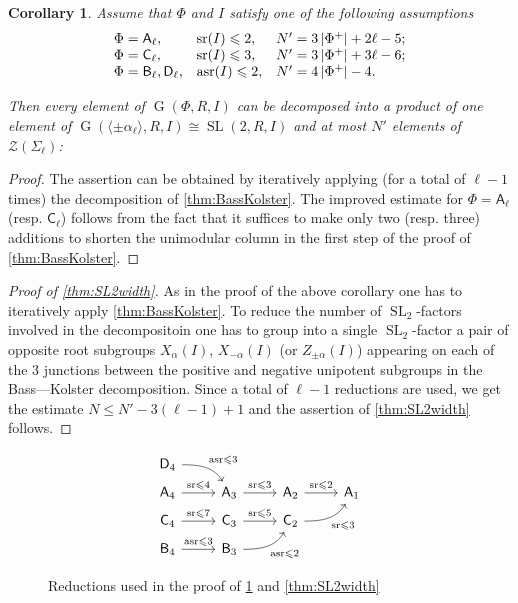 \documentclass[oneside, 12pt]{amsart}
\theoremstyle{plain}
\numberwithin{equation}{section}
\numberwithin{lemma}{section}
\newtheorem{cor}[lemma]{Corollary}
\theoremstyle{definition}
\theoremstyle{remark}
\DeclareMathOperator{\G}{G}
\DeclareMathOperator{\SL}{SL}
\DeclareMathOperator{\sr}{sr}
\DeclareMathOperator{\asr}{asr}
\newcommand{\rA}{\mathsf{A}}
\newcommand{\rB}{\mathsf{B}}
\newcommand{\rC}{\mathsf{C}}
\newcommand{\rD}{\mathsf{D}}
\begin{document}
\begin{cor}\label{cor:bass-kolster-iterated}
Assume that $\Phi$ and $I$ satisfy one of the following assumptions
\[\begin{array}{l@{\quad}l@{\quad}l}
\Phi=\rA_\ell, & \sr(I)\leqslant 2, & N'=3\left|\Phi^+\right|+2\ell - 5; \\
\Phi=\rC_\ell, & \sr(I)\leqslant 3, & N'=3\left|\Phi^+\right|+3\ell - 6; \\
\Phi=\rB_\ell, \rD_\ell, & \asr(I)\leqslant 2, & N'=4\left|\Phi^+\right| - 4.
\end{array}\]

Then every element of $\G(\Phi, R, I)$ can be decomposed into a product of one element of $\G(\langle\pm\alpha_\ell\rangle, R, I) \cong \SL(2, R, I)$ and at most $N'$ elements of $\mathcal{Z}(\Sigma_\ell)$:
\end{cor}
\begin{proof}
The assertion can be obtained by iteratively applying (for a total of $\ell-1$ times) the decomposition of \cref{thm:BassKolster}.
The improved estimate for $\Phi=\rA_\ell$ (resp. $\rC_\ell$) follows from the fact that it suffices to make only two (resp. three) additions to shorten the unimodular column in the first step of the proof of \cref{thm:BassKolster}.
\end{proof}
\begin{proof}[Proof of \cref{thm:SL2width}]
 As in the proof of the above corollary one has to iteratively apply \cref{thm:BassKolster}.
 To reduce the number of $\SL_2$-factors involved in the decompositoin one has to group into a single $\SL_2$-factor a pair of opposite root subgroups $X_{\alpha}(I)$, $X_{-\alpha}(I)$ (or $Z_{\pm\alpha}(I)$) appearing on each
 of the $3$ junctions between the positive and negative unipotent subgroups in the Bass---Kolster decomposition.
 Since a total of $\ell-1$ reductions are used, we get the estimate $N \leq N' - 3(\ell - 1) + 1$ and the assertion of \cref{thm:SL2width} follows.
\end{proof}
\begin{figure}[hb]\label{fig:bass-kolster}
\[\begin{tikzcd}[row sep=tiny]
\rD_4 \arrow[out=0, in=120]{rd}{\asr\leqslant3} & & & \\
\rA_4 \arrow{r}{\sr\leqslant4} & \rA_3 \arrow{r}{\sr\leqslant3} & \rA_2 \arrow{r}{\sr\leqslant2} & \rA_1 \\
\rC_4 \arrow{r}{\sr\leqslant7} & \rC_3 \arrow{r}{\sr\leqslant5} & \rC_2 \arrow[out=0, in=-120, swap]{ru}{\sr\leqslant3} \\
\rB_4 \arrow{r}{\asr\leqslant3} & \rB_3 \arrow[out=0, in=-120, swap]{ru}{\asr\leqslant2} & &
\end{tikzcd}\] \caption{Reductions used in the proof of \cref{cor:bass-kolster-iterated} and \cref{thm:SL2width}} \end{figure}
\end{document}
